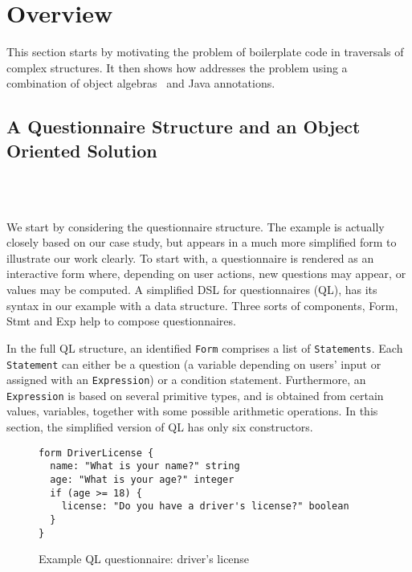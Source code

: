 \section{Overview}\label{subsec:overview}

This section starts by motivating the problem of boilerplate code in
traversals of complex structures. It then shows how \name addresses
the problem using a combination of object algebras~\cite{bruno12oa}
and Java annotations.

\subsection{A Questionnaire Structure and an Object Oriented Solution}

\\
\\

We start by considering the questionnaire structure. The example is actually closely based on our case study, but appears in a much more simplified form to illustrate our work clearly. To start with, a questionnaire is rendered as an interactive form where, depending on user actions, new questions may appear, or values may be computed. A simplified DSL for questionnaires (QL), has its syntax in our example with a data structure. Three sorts of components, Form, Stmt and Exp help to compose questionnaires.

In the full QL structure, an identified \lstinline{Form} comprises a list of \lstinline{Statements}. Each \lstinline{Statement} can either be a question (a variable depending on users' input or assigned with an \lstinline{Expression}) or a condition statement. Furthermore, an \lstinline{Expression} is based on several primitive types, and is obtained from certain values, variables, together with some possible arithmetic operations. In this section, the simplified version of QL has only six constructors.

\begin{figure}[t]
\nocaptionrule
\begin{lstlisting}[language=ql]
form DriverLicense {
  name: "What is your name?" string
  age: "What is your age?" integer
  if (age >= 18) {
    license: "Do you have a driver's license?" boolean
  }
}
\end{lstlisting}
\caption{Example QL questionnaire: driver's license}
\label{driver_license}
\end{figure}

